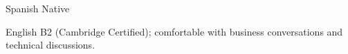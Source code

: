 
\begin{cvskills}

  \cvskill
    {Spanish} %
    {Native} %

  \cvskill
    {English} %
    {B2 (Cambridge Certified); comfortable with business conversations and technical discussions.} %
\end{cvskills}
